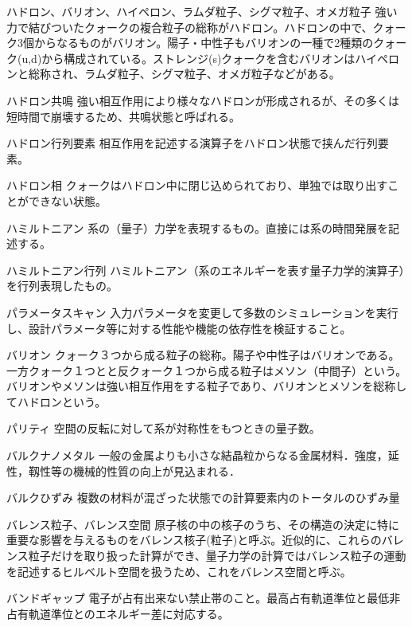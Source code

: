 \begin{用語集}
\item{ハドロン、バリオン、ハイペロン、ラムダ粒子、シグマ粒子、オメガ粒子}{}
{強い力で結びついたクォークの複合粒子の総称がハドロン。ハドロンの中で、クォーク3個からなるものがバリオン。陽子・中性子もバリオンの一種で2種類のクォーク(u,d)から構成されている。ストレンジ(s)クォークを含むバリオンはハイペロンと総称され、ラムダ粒子、シグマ粒子、オメガ粒子などがある。}
\item{ハドロン共鳴}{}
{強い相互作用により様々なハドロンが形成されるが、その多くは短時間で崩壊するため、共鳴状態と呼ばれる。}
\item{ハドロン行列要素}{}
{相互作用を記述する演算子をハドロン状態で挟んだ行列要素。}
\item{ハドロン相}{}
{クォークはハドロン中に閉じ込められており、単独では取り出すことができない状態。}
\item{ハミルトニアン}{}
{系の（量子）力学を表現するもの。直接には系の時間発展を記述する。}
\item{ハミルトニアン行列}{}
{ハミルトニアン（系のエネルギーを表す量子力学的演算子）を行列表現したもの。}
\item{パラメータスキャン}{}
{入力パラメータを変更して多数のシミュレーションを実行し、設計パラメータ等に対する性能や機能の依存性を検証すること。}
\item{バリオン}{}
{クォーク３つから成る粒子の総称。陽子や中性子はバリオンである。一方クォーク１つとと反クォーク１つから成る粒子はメソン（中間子）という。バリオンやメソンは強い相互作用をする粒子であり、バリオンとメソンを総称してハドロンという。}
\item{パリティ}{}
{空間の反転に対して系が対称性をもつときの量子数。}
\item{バルクナノメタル}{}
{一般の金属よりも小さな結晶粒からなる金属材料．強度，延性，靱性等の機械的性質の向上が見込まれる．}
\item{バルクひずみ}{}
{複数の材料が混ざった状態での計算要素内のトータルのひずみ量}
\item{バレンス粒子、バレンス空間}{}
{原子核の中の核子のうち、その構造の決定に特に重要な影響を与えるものをバレンス核子(粒子)と呼ぶ。近似的に、これらのバレンス粒子だけを取り扱った計算ができ、量子力学の計算ではバレンス粒子の運動を記述するヒルベルト空間を扱うため、これをバレンス空間と呼ぶ。}
\item{バンドギャップ}{}
{電子が占有出来ない禁止帯のこと。最高占有軌道準位と最低非占有軌道準位とのエネルギー差に対応する。}

\end{用語集}
